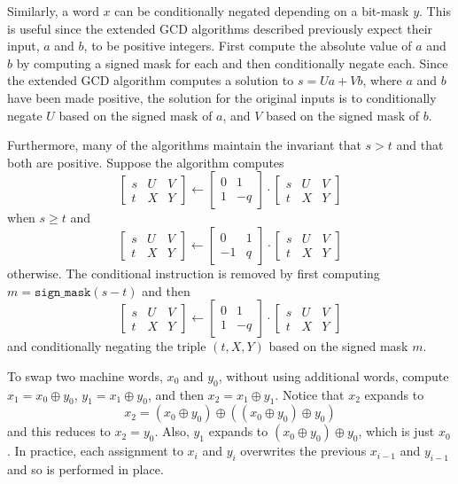 \documentclass{ucalgthes1}
\theoremstyle{definition}
\newcommand{\matrixtt}[4]{\left[ \begin{array}{rr} #1 & #2 \\ #3 & #4 \end{array} \right]}
\newcommand{\matrixThreeTwo}[6]{\left[ \begin{array}{rrr} #1 & #2 & #3 \\ #4 & #5 & #6 \end{array} \right]}
\newcommand{\bxor}{\oplus}
\begin{document}
Similarly, a word $x$ can be conditionally negated depending on a bit-mask $y$.  This is useful since the extended GCD algorithms described previously expect their input, $a$ and $b$, to be positive integers.  First compute the absolute value of $a$ and $b$ by computing a signed mask for each and then conditionally negate each.  Since the extended GCD algorithm computes a solution to $s = Ua + Vb$, where $a$ and $b$ have been made positive, the solution for the original inputs is to conditionally negate $U$ based on the signed mask of $a$, and $V$ based on the signed mask of $b$.

Furthermore, many of the algorithms maintain the invariant that $s > t$ and that both are positive.  Suppose the algorithm computes
\[
 \matrixThreeTwo{s}{U}{V}{t}{X}{Y} \gets \matrixtt{0}{1}{1}{-q} \cdot \matrixThreeTwo{s}{U}{V}{t}{X}{Y}
\]
when $s \ge t$ and
\[
\matrixThreeTwo{s}{U}{V}{t}{X}{Y} \gets \matrixtt{0}{1}{-1}{q} \cdot \matrixThreeTwo{s}{U}{V}{t}{X}{Y}
\]
otherwise.  The conditional instruction is removed by first computing $m = \texttt{sign\_mask}(s - t)$ and then 
\[
 \matrixThreeTwo{s}{U}{V}{t}{X}{Y} \gets \matrixtt{0}{1}{1}{-q} \cdot \matrixThreeTwo{s}{U}{V}{t}{X}{Y}
\]
and conditionally negating the triple $(t, X, Y)$ based on the signed mask $m$.

To swap two machine words, $x_0$ and $y_0$, without using additional words, compute $x_1 = x_0 \bxor y_0$, $y_1 = x_1 \bxor y_0$, and then $x_2 = x_1 \bxor y_1$.  Notice that $x_2$ expands to
\[
	x_2 = (x_0 \bxor y_0) \bxor ((x_0 \bxor y_0) \bxor y_0)
\]
and this reduces to $x_2 = y_0$.  Also, $y_1$ expands to $(x_0 \bxor y_0) \bxor y_0$, which is just $x_0$.  In practice, each assignment to $x_i$ and $y_i$ overwrites the previous $x_{i-1}$ and $y_{i-1}$ and so is performed in place.
\end{document}
